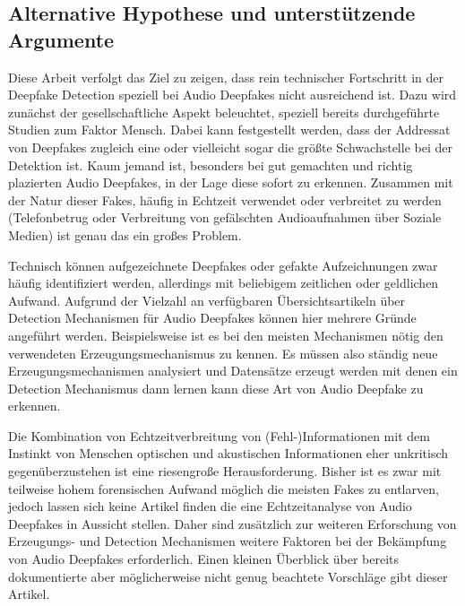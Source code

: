 \subsection{Alternative Hypothese und unterstützende Argumente}
Diese Arbeit verfolgt das Ziel zu zeigen, dass rein technischer Fortschritt in der Deepfake Detection speziell bei Audio Deepfakes nicht ausreichend ist.
Dazu wird zunächst der gesellschaftliche Aspekt beleuchtet, speziell bereits durchgeführte Studien zum Faktor Mensch.
Dabei kann festgestellt werden, dass der Addressat von Deepfakes zugleich eine oder vielleicht sogar die größte Schwachstelle bei der Detektion ist.
Kaum jemand ist, besonders bei gut gemachten und richtig plazierten Audio Deepfakes, in der Lage diese sofort zu erkennen.
Zusammen mit der Natur dieser Fakes, häufig in Echtzeit verwendet oder verbreitet zu werden (Telefonbetrug oder Verbreitung von gefälschten Audioaufnahmen über Soziale Medien) ist genau das ein großes Problem.

Technisch können aufgezeichnete Deepfakes oder gefakte Aufzeichnungen zwar häufig identifiziert werden, allerdings mit beliebigem zeitlichen oder geldlichen Aufwand.
Aufgrund der Vielzahl an verfügbaren Übersichtsartikeln über Detection Mechanismen für Audio Deepfakes können hier mehrere Gründe angeführt werden.
Beispielsweise ist es bei den meisten Mechanismen nötig den verwendeten Erzeugungsmechanismus zu kennen.
Es müssen also ständig neue Erzeugungsmechanismen analysiert und Datensätze erzeugt werden mit denen ein Detection Mechanismus dann lernen kann diese Art von Audio Deepfake zu erkennen.

Die Kombination von Echtzeitverbreitung von (Fehl-)Informationen mit dem Instinkt von Menschen optischen und akustischen Informationen eher unkritisch gegenüberzustehen ist eine riesengroße Herausforderung.
Bisher ist es zwar mit teilweise hohem forensischen Aufwand möglich die meisten Fakes zu entlarven, jedoch lassen sich keine Artikel finden die eine Echtzeitanalyse von Audio Deepfakes in Aussicht stellen.
Daher sind zusätzlich zur weiteren Erforschung von Erzeugungs- und Detection Mechanismen weitere Faktoren bei der Bekämpfung von Audio Deepfakes erforderlich.
Einen kleinen Überblick über bereits dokumentierte aber möglicherweise nicht genug beachtete Vorschläge gibt dieser Artikel.